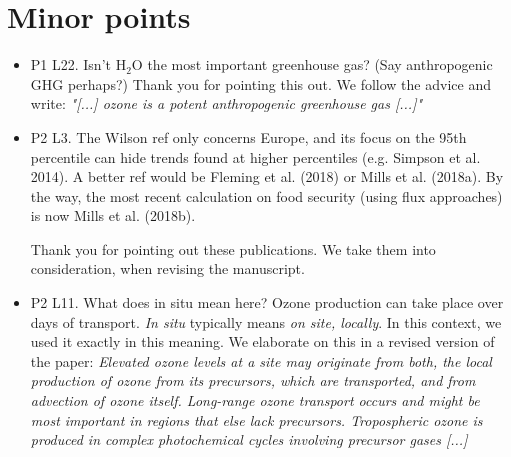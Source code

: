 \documentclass{scrartcl}
\begin{document}
\section{Minor points}
\begin{itemize}
\item {\color{blue}P1 L22. Isn’t $\mathrm{H_2O}$ the most important greenhouse gas? (Say anthropogenic
  GHG perhaps?)}
  Thank you for pointing this out. We follow the advice and write: \emph{"[...] ozone is a potent anthropogenic greenhouse gas [...]"}
\item {\color{blue}P2 L3. The Wilson ref only concerns Europe, and its focus on the 95th percentile can hide trends
  found at higher percentiles (e.g. Simpson et al. 2014). A better ref would be Fleming et al. (2018) or Mills et al. (2018a). By the way, the most recent calculation on food security (using flux approaches) is now Mills et al. (2018b).}
  
  Thank you for pointing out these publications. We take them into consideration, when revising the manuscript.
\item {\color{blue}P2 L11. What does in situ mean here? Ozone production can take place over
  days of transport.}
  \emph{In situ} typically means \emph{on site, locally}. In this context, we used it exactly in this meaning. We elaborate on this in a revised version of the paper: \emph{Elevated ozone levels at a site may originate from both, the local production of ozone from its precursors, which are transported, and from advection of ozone itself. Long-range ozone transport occurs and might be most important in regions that else lack precursors. Tropospheric ozone is produced in complex photochemical cycles involving precursor gases [...]}
  

\end{itemize}
\end{document}
